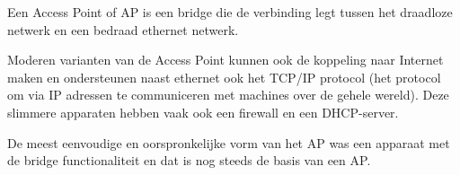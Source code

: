 Een Access Point of AP is een bridge die de verbinding legt tussen het draadloze netwerk en een bedraad ethernet netwerk.

Moderen varianten van de Access Point kunnen ook de koppeling naar Internet maken en ondersteunen naast ethernet ook het TCP/IP protocol (het protocol om via IP adressen te communiceren met machines over de gehele wereld). Deze slimmere apparaten hebben vaak ook een firewall en een DHCP-server.

De meest eenvoudige en oorspronkelijke vorm van het AP was een apparaat met de bridge functionaliteit en dat is nog steeds de basis van een AP.

